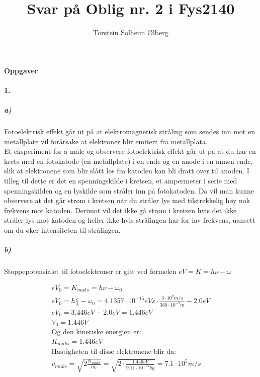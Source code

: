 \documentclass[11pt, A4paper,norsk]{article}
\author{Torstein Solheim Ølberg}
\title{Svar på Oblig nr. 2 i Fys2140}
\begin{document}
\maketitle
	\begin{center}
\Large \textbf{Oppgaver}
	\end{center}









		\paragraph{1.}
			\subparagraph{a)}
				\begin{flushleft}
Fotoelektrisk effekt går ut på at elektromagnetisk stråling som sendes inn mot en metallplate vil forårsake at elektroner blir emitert fra metallplata. \\
Et eksperiment for å måle og observere fotoelektrisk effekt går ut på at du har en krets med en fotokatode (en metallplate) i en ende og en anode i en annen ende, slik at elektronene som blir slått løs fra katoden kan bli dratt over til anoden. I tilleg til dette er det en spenningskilde i kretsen, et ampermeter i serie med spenningskilden og en lyskilde som stråler inn på fotokatoden. Da vil man kunne observere at det går strøm i kretsen når du stråler lys med tilstrekkelig høy nok frekvens mot katoden. Derimot vil det ikke gå strøm i kretsen hvis det ikke stråler lys mot katoden og heller ikke hvis strålingen har for lav frekvens, uansett om du øker intensiteten til strålingen.
				\end{flushleft}









			\subparagraph{b)}
				\begin{flushleft}
Stoppepotensialet til fotoelektroner er gitt ved formelen $eV = K = h \nu - \omega$
				\end{flushleft}
				\begin{gather}
eV_0 = K_{maks} = h \nu - \omega_0 \\
eV_0 = h \frac{c}{\lambda} - \omega_0 = 4.1357 \cdot 10^{-15} eVs \cdot \frac{3 \cdot 10^{8} m/s}{360 \cdot 10^{-9} m} - 2.0 eV \\
eV_0 = 3.446 eV - 2.0 eV = 1.446 eV \\
V_0 = 1.446 V \\
\text{Og den kinetiske energien er:} \nonumber \\
K_{maks} = 1.446 eV \\
\text{Hastigheten til disse elektronene blir da:} \nonumber \\
v_{maks} = \sqrt{2 \frac{K_{maks}}{m_e}} = \sqrt{2 \cdot \frac{1.446 eV}{9.11 \cdot 10^{-31} kg}} = 7.1 \cdot 10^{5} m/s
				\end{gather}
\end{document}

